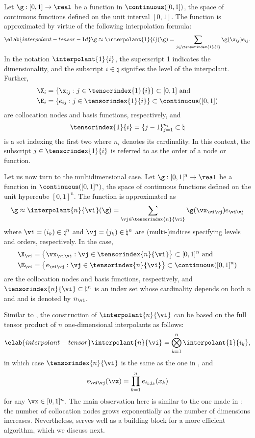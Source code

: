 Let $\g: [0, 1] \to \real$ be a function in $\continuous([0, 1])$, the space of
continuous functions defined on the unit interval $[0, 1]$. The function is
approximated by virtue of the following interpolation formula:
\begin{equation} \elab{interpolant-tensor-1d}
  \g \approx \interpolant{1}{i}(\g) = \sum_{j \in \tensorindex{1}{i}} \g(\x_{ij}) e_{ij}.
\end{equation}
In the notation $\interpolant{1}{i}$, the superscript 1 indicates the
dimensionality, and the subscript $i \in \natural$ signifies the level of the
interpolant. Further,
\begin{align*}
  & \X_i = \{ \x_{ij}: j \in \tensorindex{1}{i} \} \subset [0, 1] \text{ and} \\
  & \E_i = \{ e_{ij}: j \in \tensorindex{1}{i} \} \subset \continuous([0, 1])
\end{align*}
are collocation nodes and basis functions, respectively, and
\[
  \tensorindex{1}{i} = \{ j - 1 \}_{j = 1}^{n_i} \subset \natural
\]
is a set indexing the first two where $n_i$ denotes its cardinality. In this
context, the subscript $j \in \tensorindex{1}{i}$ is referred to as the order of
a node or function.

Let us now turn to the multidimensional case. Let $\g: [0, 1]^n \to \real$ be a
function in $\continuous([0, 1]^n)$, the space of continuous functions defined
on the unit hypercube $[0, 1]^n$. The function is approximated as
\[
  \g \approx \interpolant{n}{\vi}(\g)
  = \sum_{\vj \in \tensorindex{n}{\vi}} \g(\vx_{\vi \vj}) e_{\vi \vj}
\]
where $\vi = (i_k) \in \natural^n$ and $\vj = (j_k) \in \natural^n$ are
(multi-)indices specifying levels and orders, respectively. In the case,
\begin{align*}
  & \X_{\vi} = \left\{ \vx_{\vi \vj}: \vj \in \tensorindex{n}{\vi} \right\} \subset [0, 1]^n \text{ and} \\
  & \E_{\vi} = \left\{ e_{\vi \vj}: \vj \in \tensorindex{n}{\vi} \right\} \subset \continuous([0, 1]^n)
\end{align*}
are the collocation nodes and basis functions, respectively, and
$\tensorindex{n}{\vi} \subset \natural^n$ is an index set whose cardinality
depends on both $n$ and \vi and is denoted by $n_{\vi}$.

Similar to , the construction of $\interpolant{n}{\vi}$
can be based on the full tensor product of $n$ one-dimensional interpolants as
follows:
\begin{equation} \elab{interpolant-tensor}
  \interpolant{n}{\vi} = \bigotimes_{k = 1}^n \interpolant{1}{i_k},
\end{equation}
in which case $\tensorindex{n}{\vi}$ is the same as the one in
, and
\[
  e_{\vi \vj}(\vx) = \prod_{k = 1}^n e_{i_k j_k}(x_k)
\]
for any $\vx \in [0, 1]^n$. The main observation here is similar to the one made
in : the number of collocation nodes grows
exponentially as the number of dimensions increases. Nevertheless,
 serves well as a building block for a more efficient
algorithm, which we discuss next.


